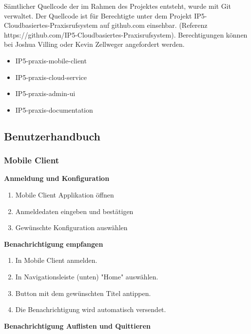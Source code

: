     Sämtlicher Quellcode der im Rahmen des Projektes entsteht, wurde mit Git verwaltet. Der Quellcode ist für Berechtigte unter dem Projekt IP5-Cloudbasiertes-Praxisrufsystem auf github.com einsehbar.
    (Referenz https://github.com/IP5-Cloudbasiertes-Praxisrufsystem). Berechtigungen können bei Joshua Villing oder Kevin Zellweger angefordert werden.

    \begin{itemize}
        \item IP5-praxis-mobile-client
        \item IP5-praxis-cloud-service
        \item IP5-praxis-admin-ui
        \item IP5-praxis-documentation
    \end{itemize}

    \subsection{Benutzerhandbuch}

        \subsubsection*{Mobile Client}

        \textbf{Anmeldung und Konfiguration}

        \begin{enumerate}
            \item Mobile Client Applikation öffnen
            \item Anmeldedaten eingeben und bestätigen
            \item Gewünschte Konfiguration auswählen
        \end{enumerate}

        \textbf{Benachrichtigung empfangen}

        \begin{enumerate}
            \item In Mobile Client anmelden.
            \item In Navigationsleiste (unten) "Home" auswählen.
            \item Button mit dem gewünschten Titel antippen.
            \item Die Benachrichtigung wird automatisch versendet.
        \end{enumerate}

        \textbf{Benachrichtigung Auflisten und Quittieren}

